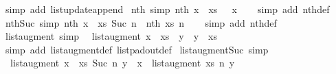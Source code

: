 \begin{isabellebody}
\isamarkupfalse%
\ {\isacharparenleft}simp\ add{\isacharcolon}\ list{\isacharunderscore}update{\isacharunderscore}append{\isacharparenright}%
\endisatagproof
{\isafoldproof}%
%
\isadelimproof
\isanewline
%
\endisadelimproof
\isanewline
{}\isamarkupfalse%
\ nth{\isacharprime}{\isacharunderscore}{}\ {\isacharbrackleft}simp{\isacharbrackright}{\isacharcolon}\ {\isachardoublequoteopen}nth{\isacharprime}\ {\isacharparenleft}x\ {\isacharhash}\ xs{\isacharparenright}\ {}\ {\isacharequal}\ x{\isachardoublequoteclose}\isanewline
%
\isadelimproof
\ \ %
\endisadelimproof
%
\isatagproof
{}\isamarkupfalse%
\ {\isacharparenleft}simp\ add{\isacharcolon}\ nth{\isacharprime}{\isacharunderscore}def{\isacharparenright}%
\endisatagproof
{\isafoldproof}%
%
\isadelimproof
\isanewline
%
\endisadelimproof
\isanewline
{}\isamarkupfalse%
\ nth{\isacharprime}{\isacharunderscore}Suc\ {\isacharbrackleft}simp{\isacharbrackright}{\isacharcolon}\ {\isachardoublequoteopen}nth{\isacharprime}\ {\isacharparenleft}x\ {\isacharhash}\ xs{\isacharparenright}\ {\isacharparenleft}Suc\ n{\isacharparenright}\ {\isacharequal}\ nth{\isacharprime}\ xs\ n{\isachardoublequoteclose}\isanewline
%
\isadelimproof
\ \ %
\endisadelimproof
%
\isatagproof
{}\isamarkupfalse%
\ {\isacharparenleft}simp\ add{\isacharcolon}\ nth{\isacharprime}{\isacharunderscore}def{\isacharparenright}%
\endisatagproof
{\isafoldproof}%
%
\isadelimproof
\isanewline
%
\endisadelimproof
\isanewline
{}\isamarkupfalse%
\ list{\isacharunderscore}augment{\isacharunderscore}{}\ {\isacharbrackleft}simp{\isacharbrackright}{\isacharcolon}\isanewline
\ \ {\isachardoublequoteopen}list{\isacharunderscore}augment\ {\isacharparenleft}x\ {\isacharhash}\ xs{\isacharparenright}\ {}\ y\ {\isacharequal}\ y\ {\isacharhash}\ xs{\isachardoublequoteclose}\isanewline
%
\isadelimproof
\ \ %
\endisadelimproof
%
\isatagproof
{}\isamarkupfalse%
\ {\isacharparenleft}simp\ add{\isacharcolon}\ list{\isacharunderscore}augment{\isacharunderscore}def\ list{\isacharunderscore}pad{\isacharunderscore}out{\isacharunderscore}def{\isacharparenright}%
\endisatagproof
{\isafoldproof}%
%
\isadelimproof
\isanewline
%
\endisadelimproof
\isanewline
{}\isamarkupfalse%
\ list{\isacharunderscore}augment{\isacharunderscore}Suc\ {\isacharbrackleft}simp{\isacharbrackright}{\isacharcolon}\isanewline
\ \ {\isachardoublequoteopen}list{\isacharunderscore}augment\ {\isacharparenleft}x\ {\isacharhash}\ xs{\isacharparenright}\ {\isacharparenleft}Suc\ n{\isacharparenright}\ y\ {\isacharequal}\ x\ {\isacharhash}\ list{\isacharunderscore}augment\ xs\ n\ y{\isachardoublequoteclose}\isanewline

\end{isabellebody}
